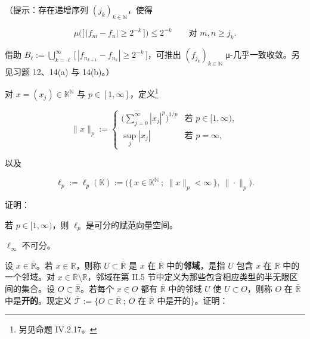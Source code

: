 \begin{exercises}
（提示：存在递增序列 $ (j_k)_{k\in\mathbb{N}} $，使得

\[
\mu\big(\big[\,|f_m-f_n|\ge 2^{-k}\,\big]\big) \le 2^{-k} \qquad \text{对 } m, n \ge j_k .
\]

借助 $ B_\ell := \bigcup_{k=\ell}^{\infty}\big[\,|f_{n_{k+1}}-f_{n_k}|\ge 2^{-k}\,\big] $，可推出 $ (f_{j_k})_{k\in\mathbb{N}} $ μ-几乎一致收敛。另见习题 12、14(a) 与 14(b)。）

\item

对 $ x = (x_j) \in \mathbb{K}^{\mathbb{N}} $ 与 $ p \in [1,\infty] $，定义\footnote{另见命题 IV.2.17。}

\begin{equation*}
\|x\|_p := \begin{cases} \Big(\sum_{j=0}^{\infty} |x_j|^{p}\Big)^{1/p} & \text{若 } p \in [1,\infty), \\ \sup_j |x_j| & \text{若 } p = \infty, \end{cases}
\end{equation*}

以及

\[
\ell_p := \ell_p(\mathbb{K}) := \big( \{\, x \in \mathbb{K}^{\mathbb{N}} \ ;\ \|x\|_p < \infty \,\},\ \|\cdot\|_p \big) .
\]

证明：

\begin{items}
\item

若 $ p \in [1,\infty) $，则 $ \ell_p $ 是可分的赋范向量空间。

\item

$ \ell_\infty $ 不可分。

\end{items}

\item

设 $ x \in \overline{\mathbb{R}} $。若 $ x \in \mathbb{R} $，则称 $ U \subset \overline{\mathbb{R}} $ 是 $ x $ 在 $ \overline{\mathbb{R}} $ 中的\textbf{邻域}，是指 $ U $ 包含 $ x $ 在 $ \mathbb{R} $ 中的一个邻域。对 $ x \in \overline{\mathbb{R}}\setminus\mathbb{R} $，邻域在第 II.5 节中定义为那些包含相应类型的半无限区间的集合。设 $ O \subset \overline{\mathbb{R}} $。若每个 $ x \in O $ 都有 $ \overline{\mathbb{R}} $ 中的邻域 $ U $ 使 $ U \subset O $，则称 $ O $ 在 $ \overline{\mathbb{R}} $ 中是\textbf{开的}。现定义 $ \overline{\mathcal{T}} := \{ O \subset \overline{\mathbb{R}} \ ;\ O \text{ 在 } \overline{\mathbb{R}} \text{ 中是开的} \} $。证明：


\end{exercises}
